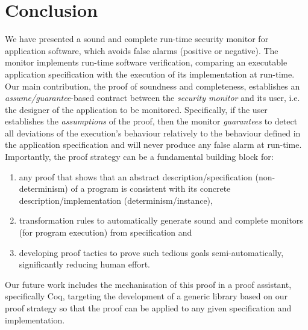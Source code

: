 \documentclass[conference]{IEEEtran}
\begin{document}
\section{Conclusion}\label{sec:conc}
We have presented a sound and complete run-time security monitor for application software,
which avoids false alarms (positive or negative). The monitor implements run-time software
verification, comparing an executable application specification with the execution of its
implementation at run-time. Our main contribution, the proof of soundness and completeness,
establishes an {\em assume/guarantee}-based contract between the \emph{security monitor}
and its user, i.e. the designer of the application to be monitored. Specifically, if the user 
establishes the {\em assumptions} of the proof, then the monitor \emph{guarantees} to detect
all deviations of the execution’s behaviour relatively to the behaviour defined in the application
specification and will never produce any false alarm at run-time. 
Importantly, the proof strategy can be a fundamental building block for:
\begin{enumerate}
\item 
any proof that shows that an abstract description/specification (non-determinism) of a program 
is consistent with its concrete description/implementation (determinism/instance),
\item 
transformation rules to automatically generate sound and complete monitors (for program execution) 
from specification and
\item 
developing proof tactics to prove such tedious goals semi-automatically, significantly reducing human effort.
\end{enumerate}
Our future work includes the mechanisation of this proof in a proof assistant, specifically Coq, targeting
the development of a generic library based on our proof strategy so that the proof can be applied to any 
given specification and implementation.
\end{document}
